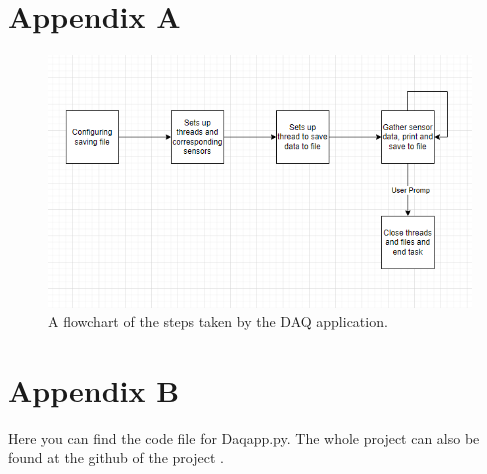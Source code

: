 \documentclass[12pt, A4paper, english]{book}
\begin{document}
	\chapter{Appendix A}
		\begin{figure}
\centering
\includegraphics[width=\linewidth]{Flowchart}
\caption{A flowchart of the steps taken by the DAQ application.}
\label{im:flowchart}
		\end{figure}


	\chapter{Appendix B}
Here you can find the code file for Daqapp.py. The whole project can also be found at the github of the project \cite{github}.

\end{document}
